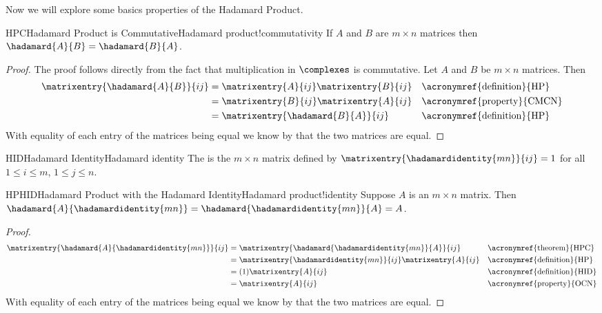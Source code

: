 %
Now we will explore some basics properties of the Hadamard Product.
%
\begin{theorem}{HPC}{Hadamard Product is Commutative}{Hadamard product!commutativity}
If $A$ and $B$ are $m \times n$ matrices then $\hadamard{A}{B} = \hadamard{B}{A}$.
\end{theorem}
%
\begin{proof}
The proof follows directly from the fact that multiplication in $\complexes$ is commutative. Let $A$ and $B$ be $m \times n$ matrices. Then
%
\begin{align*}
\matrixentry{\hadamard{A}{B}}{ij}
&= \matrixentry{A}{ij}\matrixentry{B}{ij}
&& \text{\acronymref{definition}{HP}} \\
%
&= \matrixentry{B}{ij}\matrixentry{A}{ij}
&& \text{\acronymref{property}{CMCN}} \\
%
&= \matrixentry{\hadamard{B}{A}}{ij}
&& \text{\acronymref{definition}{HP}}
\end{align*}
With equality of each entry of the matrices being equal we know by  that the two matrices are equal.
\end{proof}
%
\begin{definition}{HID}{Hadamard Identity}{Hadamard identity}
The  is the $m \times n$ matrix  defined by $\matrixentry{\hadamardidentity{mn}}{ij} = 1$ for all $1 \leq i \leq m$, $1 \leq j \leq n$.
%
\end{definition}
%
\begin{theorem}{HPHID}{Hadamard Product with the Hadamard Identity}{Hadamard product!identity}
Suppose $A$ is an $m \times n$ matrix. Then $\hadamard{A}{\hadamardidentity{mn}} = \hadamard{\hadamardidentity{mn}}{A} = A$.
\end{theorem}
\begin{proof}
\begin{align*}
\matrixentry{\hadamard{A}{\hadamardidentity{mn}}}{ij}
&= \matrixentry{\hadamard{\hadamardidentity{mn}}{A}}{ij}
&& \text{\acronymref{theorem}{HPC}} \\
%
&= \matrixentry{\hadamardidentity{mn}}{ij}\matrixentry{A}{ij}
&& \text{\acronymref{definition}{HP}} \\
%
&= (1) \matrixentry{A}{ij}
&& \text{\acronymref{definition}{HID}} \\
%
&= \matrixentry{A}{ij}
&& \text{\acronymref{property}{OCN}}
\end{align*}
With equality of each entry of the matrices being equal we know by  that the two matrices are equal.
\end{proof}
